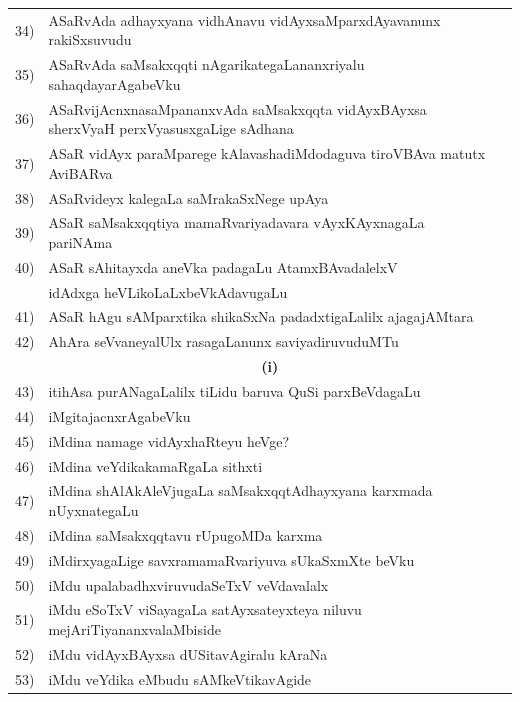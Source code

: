 \begin{longtable}{@{}cp{7.4cm}r}
34) & ASaRvAda adhayxyana vidhAnavu vidAyxsaMparxdAyavanunx rakiSxsuvudu & \pageref{page48}\\
35) & ASaRvAda saMsakxqqti nAgarikategaLananxriyalu sahaqdayarAgabeVku & \pageref{page51a}\\
36) & ASaRvijAcnxnasaMpananxvAda saMsakxqqta vidAyxBAyxsa sherxVyaH perxVyasusxgaLige sAdhana & \pageref{page42b}\\
37) & ASaR vidAyx paraMparege kAlavashadiMdodaguva tiroVBAva matutx AviBARva & \pageref{???}\\%
38) & ASaRvideyx kalegaLa saMrakaSxNege upAya & \pageref{page50a} \\
39) & ASaR saMsakxqqtiya mamaRvariyadavara vAyxKAyxnagaLa pariNAma & \pageref{page24}\\
40) & ASaR sAhitayxda aneVka padagaLu AtamxBAvadalelxV & \\
    & idAdxga heVLikoLaLxbeVkAdavugaLu   & \pageref{page246}\\
41) & ASaR hAgu sAMparxtika shikaSxNa padadxtigaLalilx ajagajAMtara  & \pageref{page28}\\
42) & AhAra seVvaneyalUlx rasagaLanunx saviyadiruvuduMTu & \pageref{page221a}\\[0.3cm]
    & \multicolumn{1}{c}{\textbf{(i)}} & \\[0.3cm]
43) & itihAsa purANagaLalilx tiLidu baruva QuSi parxBeVdagaLu &  \pageref{page62}\\
44) & iMgitajacnxrAgabeVku  & \pageref{page122a}\\
45) & iMdina namage vidAyxhaRteyu heVge? & \pageref{page109a}\\
46) & iMdina veYdikakamaRgaLa sithxti & \pageref{page208}\\
47) & iMdina shAlAkAleVjugaLa saMsakxqqtAdhayxyana karxmada nUyxnategaLu & \pageref{page43}\\
48) & iMdina saMsakxqqtavu rUpugoMDa karxma & \pageref{page12}\\
49) & iMdirxyagaLige savxramamaRvariyuva sUkaSxmXte beVku & \pageref{page125}\\
50) & iMdu upalabadhxviruvudaSeTxV veVdavalalx & \pageref{page134}\\
51) & iMdu eSoTxV viSayagaLa satAyxsateyxteya niluvu mejAriTiyananxvalaMbiside & \pageref{page215a}\\
52) & iMdu vidAyxBAyxsa dUSitavAgiralu kAraNa & \pageref{page41e}\\
53) & iMdu veYdika eMbudu sAMkeVtikavAgide & \pageref{page206}\\ [0.3cm]  

\end{longtable}

